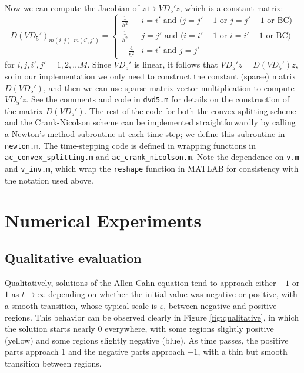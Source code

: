 \documentclass{article}
\begin{document}
	Now we can compute the Jacobian of $z \mapsto VD_5'z$, which is a constant matrix:
	\begin{equation*}
		D(VD_5')_{m(i,j), m(i',j')} = \begin{cases}
			\frac{1}{h^2} & i = i' \text{ and } \big(j = j' + 1 \text{ or } j = j'-1 \text{ or BC}\big) \\
			\frac{1}{h^2} & j = j' \text{ and } \big(i = i' + 1 \text{ or } i = i'-1 \text{ or BC}\big) \\
			-\frac{4}{h^2} & i = i' \text{ and } j = j'
		\end{cases}
	\end{equation*}
	for $i,j,i',j' = 1,2,\dots M$. Since $VD_5'$ is linear, it follows that $VD_5'z = D(VD_5')z$, so in our implementation we only need to construct the constant (sparse) matrix $D(VD_5')$, and then we can use sparse matrix-vector multiplication to compute $VD_5'z$. See the comments and code in \verb*|dvd5.m| for details on the construction of the matrix $D(VD_5')$. The rest of the code for both the convex splitting scheme and the Crank-Nicolson scheme can be implemented straightforwardly by calling a Newton's method subroutine at each time step; we define this subroutine in \verb*|newton.m|. The time-stepping code is defined in wrapping functions in \verb*|ac_convex_splitting.m| and \verb*|ac_crank_nicolson.m|. Note the dependence on \verb*|v.m| and \verb*|v_inv.m|, which wrap the \texttt{reshape} function in MATLAB for consistency with the notation used above.
	
	\section{Numerical Experiments}
	
	\subsection{Qualitative evaluation}
	
	Qualitatively, solutions of the Allen-Cahn equation tend to approach either $-1$ or $1$ as $t \to \infty$ depending on whether the initial value was negative or positive, with a smooth transition, whose typical scale is $\varepsilon$, between negative and positive regions. This behavior can be observed clearly in Figure \ref{fig:qualitative}, in which the solution starts nearly 0 everywhere, with some regions slightly positive (yellow) and some regions slightly negative (blue). As time passes, the positive parts approach 1 and the negative parts approach $-1$, with a thin but smooth transition between regions.
	
\end{document}
